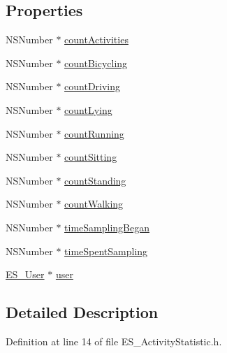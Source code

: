 \subsection*{Properties}
\begin{DoxyCompactItemize}
\item 
N\+S\+Number $\ast$ \hyperlink{interface_e_s___activity_statistic_aed52c406bbca6ecf68b1eb1cb951db14}{count\+Activities}
\item 
N\+S\+Number $\ast$ \hyperlink{interface_e_s___activity_statistic_ace372302725e6c086aa66da168af1179}{count\+Bicycling}
\item 
N\+S\+Number $\ast$ \hyperlink{interface_e_s___activity_statistic_aec46a7dfecbb6dcee71de6fa2ee2574c}{count\+Driving}
\item 
N\+S\+Number $\ast$ \hyperlink{interface_e_s___activity_statistic_a4c32d27f78a94dfee30ce9f425f7312f}{count\+Lying}
\item 
N\+S\+Number $\ast$ \hyperlink{interface_e_s___activity_statistic_a48604266bf6617edb7794e46c2e5c57f}{count\+Running}
\item 
N\+S\+Number $\ast$ \hyperlink{interface_e_s___activity_statistic_add12759c6e1a52478d7a6b071d5a3c3a}{count\+Sitting}
\item 
N\+S\+Number $\ast$ \hyperlink{interface_e_s___activity_statistic_a0140f8ac7cbaa9faa0103e681a9ff8a2}{count\+Standing}
\item 
N\+S\+Number $\ast$ \hyperlink{interface_e_s___activity_statistic_a4bf1dba4f174c86495d3bb9a8d7c4ca1}{count\+Walking}
\item 
N\+S\+Number $\ast$ \hyperlink{interface_e_s___activity_statistic_abfd03c43c917a0cac6dea842970db82b}{time\+Sampling\+Began}
\item 
N\+S\+Number $\ast$ \hyperlink{interface_e_s___activity_statistic_a32841bc914809e0b86f4aadefaa41d7a}{time\+Spent\+Sampling}
\item 
\hyperlink{interface_e_s___user}{E\+S\+\_\+\+User} $\ast$ \hyperlink{interface_e_s___activity_statistic_ad38284d32f9bb2d9a1ef1fcf6b28d446}{user}
\end{DoxyCompactItemize}


\subsection{Detailed Description}


Definition at line 14 of file E\+S\+\_\+\+Activity\+Statistic.\+h.



